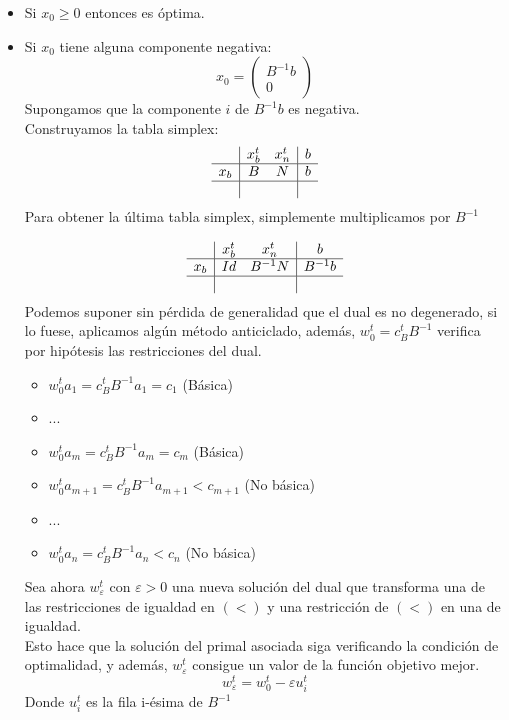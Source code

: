 \documentclass[11pt,fleqn]{book} %
\begin{document}
\begin{itemize}
\item Si $x_0 \geq 0$ entonces es óptima.
\item Si $x_0$ tiene alguna componente negativa:
  $$x_0 = \left(
  \begin{array}{c}
	B^{-1} b \\
	0
  \end{array}
  \right)$$
  Supongamos que la componente $i$ de $B^{-1} b$ es negativa. \\
  Construyamos la tabla simplex:
  $$
  \begin{array}{c|cc|c}
	& x_b^t & x_n^t  & b\\ \hline
	x_b& B & N  & b \\ \hline
	& & & 
  \end{array}
  $$
  Para obtener la última tabla simplex, simplemente 
  multiplicamos por $B^{-1}$
  
  $$
  \begin{array}{c|cc|c}
	& x_b^t & x_n^t  & b\\ \hline
	x_b& Id & B^{-1} N & B^{-1} b \\ \hline
	& & &
  \end{array}
  $$
  Podemos suponer sin pérdida de generalidad que el dual es no degenerado, si lo fuese, aplicamos algún método anticiclado, además, $w_0^t=c_B^t B^{-1}$ verifica por hipótesis las restricciones del dual. \\
  \begin{itemize}
  	\item $w_0^t a_1=c_B^t B^{-1} a_1 = c_1$ (Básica)
  	\item ...
  	\item $w_0^t a_m=c_B^t B^{-1} a_m = c_m$ (Básica)
  	\item $w_0^t a_{m+1}=c_B^t B^{-1} a_{m+1} < c_{m+1}$ (No básica)
  	\item ...
  	\item $w_0^t a_{n}=c_B^t B^{-1} a_{n} < c_{n}$ (No básica)	
  \end{itemize}

   Sea ahora $w_\varepsilon^t$ con $\varepsilon>0$ una nueva solución del dual que transforma una de las restricciones de igualdad en $(<)$ y una restricción de $(<)$ en una de igualdad. \\
   Esto hace que la solución del primal asociada siga verificando la condición de optimalidad, y además, $w_\varepsilon^t$ consigue un valor de la función objetivo mejor.
   $$
	   w_\varepsilon^t=w_0^t-\varepsilon u_i^t
   $$	
   Donde $u_i^t$ es la fila i-ésima de $B^{-1}$
   

\end{itemize}
\end{document}
